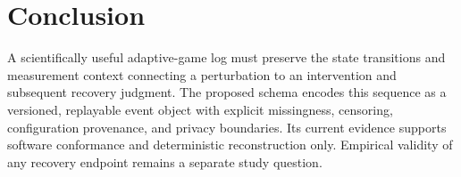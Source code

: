 \section{Conclusion}

A scientifically useful adaptive-game log must preserve the state transitions and measurement context connecting a perturbation to an intervention and subsequent recovery judgment. The proposed schema encodes this sequence as a versioned, replayable event object with explicit missingness, censoring, configuration provenance, and privacy boundaries. Its current evidence supports software conformance and deterministic reconstruction only. Empirical validity of any recovery endpoint remains a separate study question.
